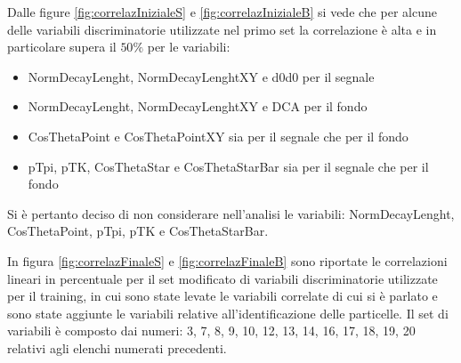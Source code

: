     Dalle figure \ref{fig:correlazInizialeS} e \ref{fig:correlazInizialeB} si vede che per alcune delle variabili discriminatorie utilizzate nel primo set la correlazione \`e alta e in particolare supera il $50 \%$ per le variabili:
    \begin{itemize}
        \item NormDecayLenght, NormDecayLenghtXY e d0d0 per il segnale
        \item NormDecayLenght, NormDecayLenghtXY e DCA per il fondo 
        \item CosThetaPoint e CosThetaPointXY sia per il segnale che per il fondo
        \item pTpi, pTK, CosThetaStar e CosThetaStarBar sia per il segnale che per il fondo
    \end{itemize}
    
    Si \`e pertanto deciso di non considerare nell'analisi le variabili: NormDecayLenght, CosThetaPoint, pTpi, pTK e CosThetaStarBar.
    
    In figura \ref{fig:correlazFinaleS} e \ref{fig:correlazFinaleB} sono riportate le correlazioni lineari in percentuale per il set modificato di variabili discriminatorie utilizzate per il training, in cui sono state levate le variabili correlate di cui si \`e parlato e sono state aggiunte le variabili relative all'identificazione delle particelle. Il set di variabili \`e composto dai numeri: 3, 7, 8, 9, 10, 12, 13, 14, 16, 17, 18, 19, 20 relativi agli elenchi numerati precedenti.
    \\
    
